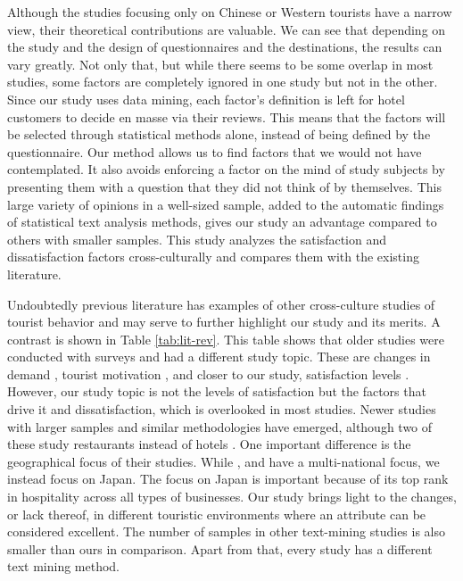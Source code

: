 \documentclass[smallextended,natbib]{svjour3}       %
\begin{document}
    Although the studies focusing only on Chinese or Western tourists have a narrow view, their theoretical contributions are valuable. We can see that depending on the study and the design of questionnaires and the destinations, the results can vary greatly. Not only that, but while there seems to be some overlap in most studies, some factors are completely ignored in one study but not in the other. Since our study uses data mining, each factor's definition is left for hotel customers to decide en masse via their reviews. This means that the factors will be selected through statistical methods alone, instead of being defined by the questionnaire. Our method allows us to find factors that we would not have contemplated. It also avoids enforcing a factor on the mind of study subjects by presenting them with a question that they did not think of by themselves. This large variety of opinions in a well-sized sample, added to the automatic findings of statistical text analysis methods, gives our study an advantage compared to others with smaller samples. This study analyzes the satisfaction and dissatisfaction factors cross-culturally and compares them with the existing literature.

    Undoubtedly previous literature has examples of other cross-culture studies of tourist behavior and may serve to further highlight our study and its merits. A contrast is shown in Table \ref{tab:lit-rev}. This table shows that older studies were conducted with surveys and had a different study topic. These are changes in demand \cite[][]{bauer1993changing}, tourist motivation \cite[][]{kim2000}, and closer to our study, satisfaction levels \cite[][]{choi2000}. However, our study topic is not the levels of satisfaction but the factors that drive it and dissatisfaction, which is overlooked in most studies. Newer studies with larger samples and similar methodologies have emerged, although two of these study restaurants instead of hotels \cite[][]{JIA2020104071, HUANG2017117}. One important difference is the geographical focus of their studies. While \cite{FRANCESCO201924} , \cite{JIA2020104071} and \cite{HUANG2017117} have a multi-national focus, we instead focus on Japan. The focus on Japan is important because of its top rank in hospitality across all types of businesses. Our study brings light to the changes, or lack thereof, in different touristic environments where an attribute can be considered excellent. The number of samples in other text-mining studies is also smaller than ours in comparison. Apart from that, every study has a different text mining method.
\end{document}

